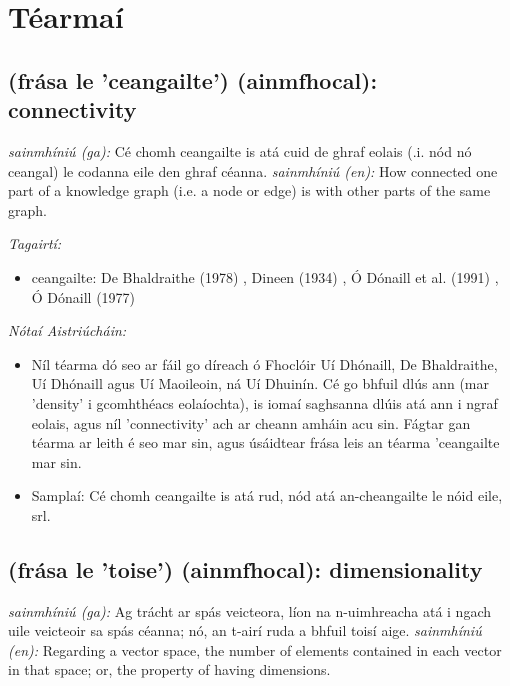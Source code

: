 \documentclass{article}
\begin{document}
\newpage \section{Téarmaí}
\subsection*{(frása le 'ceangailte') (ainmfhocal): connectivity} 
 \noindent \textit{sainmhíniú (ga):} Cé chomh ceangailte is atá cuid de ghraf eolais (.i. nód nó ceangal) le codanna eile den ghraf céanna.
\newline\newline
 \noindent \textit{sainmhíniú (en):} How connected one part of a knowledge graph (i.e. a node or edge) is with other parts of the same graph.
\newline

 \noindent \textit{Tagairtí:}
\begin{itemize}
	\item ceangailte: De Bhaldraithe (1978) \cite{de-bhaldraithe}, Dineen (1934) \cite{dineen}, Ó Dónaill et al. (1991) \cite{focloir-beag}, Ó Dónaill (1977) \cite{odonaill}
\end{itemize}

 \noindent \textit{Nótaí Aistriúcháin:}
\begin{itemize}
	\item Níl téarma dó seo ar fáil go díreach ó Fhoclóir Uí Dhónaill, De Bhaldraithe, Uí Dhónaill agus Uí Maoileoin, ná Uí Dhuinín. Cé go bhfuil dlús ann (mar 'density' i gcomhthéacs eolaíochta), is iomaí saghsanna dlúis atá ann i ngraf eolais, agus níl 'connectivity' ach ar cheann amháin acu sin. Fágtar gan téarma ar leith é seo mar sin, agus úsáidtear frása leis an téarma 'ceangailte mar sin.
	\item Samplaí: Cé chomh ceangailte is atá rud, nód atá an-cheangailte le nóid eile, srl.
\end{itemize}


\subsection*{(frása le 'toise') (ainmfhocal): dimensionality} 
 \noindent \textit{sainmhíniú (ga):} Ag trácht ar spás veicteora, líon na n-uimhreacha atá i ngach uile veicteoir sa spás céanna; nó, an t-airí ruda a bhfuil toisí aige.
\newline\newline
 \noindent \textit{sainmhíniú (en):} Regarding a vector space, the number of elements contained in each vector in that space; or, the property of having dimensions.
\newline
\end{document}
